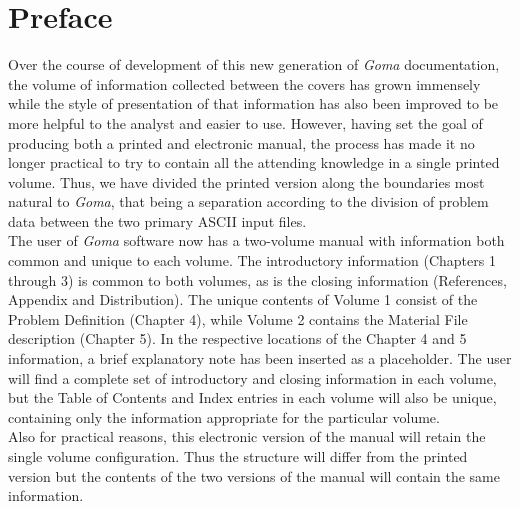 \chapter*{Preface}
%
Over the course of development of this new generation of \emph{Goma} documentation, the volume of
information collected between the covers has grown immensely while the style of presentation of
that information has also been improved to be more helpful to the analyst and easier to use.
However, having set the goal of producing both a printed and electronic manual, the process has
made it no longer practical to try to contain all the attending knowledge in a single printed
volume. Thus, we have divided the printed version along the boundaries most natural to \emph{Goma},
that being a separation according to the division of problem data between the two primary ASCII
input files. \\
%
The user of \emph{Goma} software now has a two-volume manual with information both common and
unique to each volume. The introductory information (Chapters 1 through 3) is common to both
volumes, as is the closing information (References, Appendix and Distribution). The unique
contents of Volume 1 consist of the Problem Definition (Chapter 4), while Volume 2 contains the
Material File description (Chapter 5). In the respective locations of the Chapter 4 and 5
information, a brief explanatory note has been inserted as a placeholder. The user will find a
complete set of introductory and closing information in each volume, but the Table of Contents
and Index entries in each volume will also be unique, containing only the information appropriate
for the particular volume. \\
%
Also for practical reasons, this electronic version of the manual will retain the single volume
configuration. Thus the structure will differ from the printed version but the contents of the two
versions of the manual will contain the same information.
%
\newpage
{}
{}
